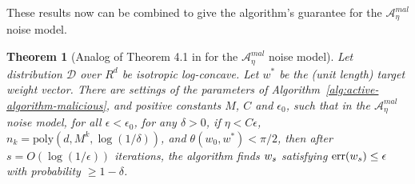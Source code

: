 \documentclass[11pt]{article}
\newcommand{\err}{\mathrm{err}}
\newtheorem{theorem}{Theorem}[section]
\newcommand{\0}{\mathbf{0}}
\newcommand{\1}{\mathbf{1}}
\newcommand{\cA}{\mathcal{A}}
\newcommand{\cD}{\mathcal{D}}
\begin{document}
These results now can be combined to give the algorithm's guarantee for the $\cA^{mal}_\eta$ noise model.
\begin{theorem}[Analog of Theorem 4.1 in \cite{awasthi2017power} for the $\cA^{mal}_\eta$ noise model]
\label{t:malicious.detailed}
Let distribution $\cD$ over $R^d$ be isotropic log-concave.  Let
$w^*$ be the (unit length) target weight vector.  There are settings
of the parameters of Algorithm~\ref{alg:active-algorithm-malicious},
and positive constants $M$, $C$ and $\epsilon_0$, such that in the $\cA^{mal}_\eta$ noise model, for all
$\epsilon < \epsilon_0$, for any $\delta>0$, if $\eta < C \epsilon$,
$n_k = \mathrm{poly}(d,M^k, \log(1/\delta))$,
and
$\theta(w_0,w^*) < \pi/2$, then after $s=O(\log(1/\epsilon))$ iterations, the algorithm
finds $w_{s}$ satisfying $\err(w_{\rounds}) \leq \epsilon$ with
probability $\geq 1-\delta$.
\end{theorem}
\end{document}
